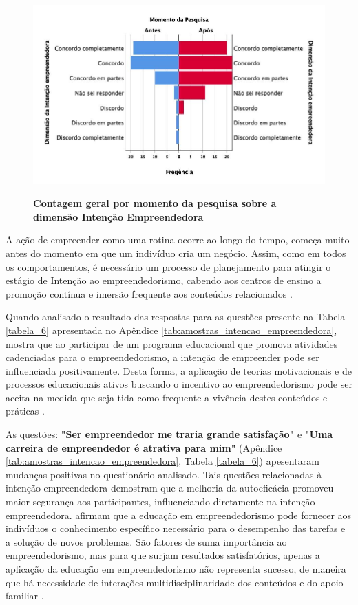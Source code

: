 \begin{figure}[H]
\centering
\caption{\textbf{Contagem geral por momento da pesquisa sobre a dimensão Intenção Empreendedora}}
\includegraphics[scale=0.4]{Imagens/dimensao_empreendedora.jpg}
\label{figura_45}
\end{figure}


A ação de empreender como uma rotina ocorre ao longo do tempo, começa muito antes do momento em que um indivíduo cria um negócio. Assim, como em todos os comportamentos, é necessário um processo de planejamento para atingir o estágio de Intenção ao empreendedorismo, cabendo aos centros de ensino a promoção contínua e imersão frequente aos conteúdos relacionados \cite{garcia-rodriguez_entrepreneurial_2017}.

Quando analisado o resultado das respostas para as questões presente na Tabela \ref{tabela_6} apresentada no Apêndice \ref{tab:amostras_intencao_empreendedora}, mostra que ao participar de um programa educacional que promova atividades cadenciadas para o empreendedorismo, a intenção de empreender pode ser influenciada positivamente. Desta forma, a aplicação de teorias motivacionais e de processos educacionais ativos buscando o incentivo ao empreendedorismo pode ser aceita na medida que seja tida como frequente a vivência destes conteúdos e práticas \cite{fayolle_beyond_2014}.

As questões: \textbf{"Ser empreendedor me traria grande satisfação"} e \textbf{"Uma carreira de empreendedor é atrativa para mim"} (Apêndice \ref{tab:amostras_intencao_empreendedora}, Tabela \ref{tabela_6}) apesentaram mudanças positivas no questionário analisado. Tais questões relacionadas à intenção empreendedora demostram que a melhoria da autoeficácia promoveu maior segurança aos participantes, influenciando diretamente na intenção empreendedora.  afirmam que a educação em empreendedorismo pode fornecer aos indivíduos o conhecimento específico necessário para o desempenho das tarefas e a solução de novos problemas. São fatores de suma importância ao empreendedorismo, mas para que surjam resultados satisfatórios, apenas a aplicação da educação em empreendedorismo não representa sucesso, de maneira que há necessidade de interações multidisciplinaridade dos conteúdos e do apoio familiar \cite{edelman_impact_2016}. 

